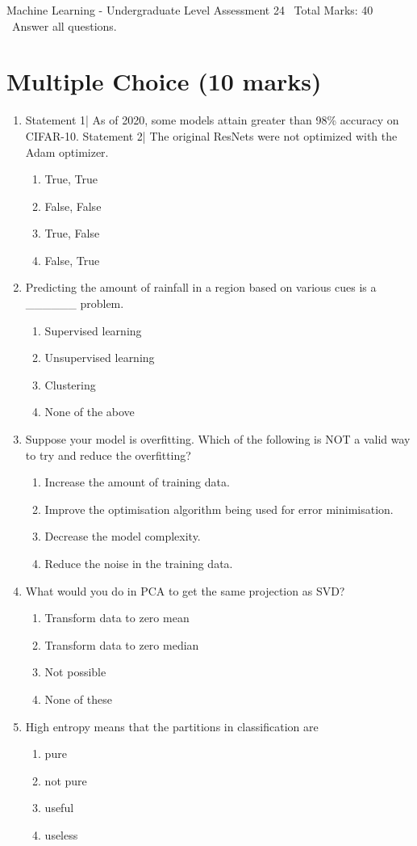 \documentclass[12pt]{article}
\begin{document}
\begin{center}
Machine Learning - Undergraduate Level Assessment 24 \
Total Marks: 40 \
Answer all questions.
\end{center}

\section*{Multiple Choice (10 marks)}
\begin{enumerate}[label=\arabic*.]
\item Statement 1| As of 2020, some models attain greater than 98\% accuracy on CIFAR-10. Statement 2| The original ResNets were not optimized with the Adam optimizer.
\begin{enumerate}[label=(\alph*)]
    \item True, True
    \item False, False
    \item True, False
    \item False, True
\end{enumerate}
\item Predicting the amount of rainfall in a region based on various cues is a \_\_\_\_\_\_ problem.
\begin{enumerate}[label=(\alph*)]
    \item Supervised learning
    \item Unsupervised learning
    \item Clustering
    \item None of the above
\end{enumerate}
\item Suppose your model is overfitting. Which of the following is NOT a valid way to try and reduce the overfitting?
\begin{enumerate}[label=(\alph*)]
    \item Increase the amount of training data.
    \item Improve the optimisation algorithm being used for error minimisation.
    \item Decrease the model complexity.
    \item Reduce the noise in the training data.
\end{enumerate}
\item What would you do in PCA to get the same projection as SVD?
\begin{enumerate}[label=(\alph*)]
    \item Transform data to zero mean
    \item Transform data to zero median
    \item Not possible
    \item None of these
\end{enumerate}
\item High entropy means that the partitions in classification are
\begin{enumerate}[label=(\alph*)]
    \item pure
    \item not pure
    \item useful
    \item useless
\end{enumerate}
\end{enumerate}
\end{document}

